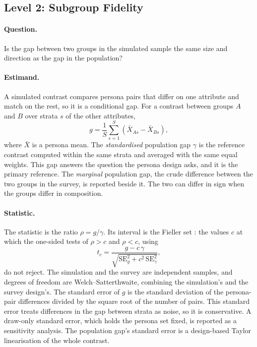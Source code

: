 \subsection*{Level 2: Subgroup Fidelity}
\label{sec:s7-l2}

\paragraph{Question.}
Is the gap between two groups in the simulated sample the same size and direction as the gap in the population?

\paragraph{Estimand.}
A simulated contrast compares persona pairs that differ on one attribute and match on the rest, so it is a conditional gap.
For a contrast between groups $A$ and $B$ over strata $s$ of the other attributes,
\begin{equation}
g = \frac{1}{S} \sum_{s=1}^{S} \left(\bar{X}_{A s} - \bar{X}_{B s}\right),
\end{equation}
where $\bar{X}$ is a persona mean.
The \emph{standardised} population gap $\gamma$ is the reference contrast computed within the same strata and averaged with the same equal weights.
This gap answers the question the persona design asks, and it is the primary reference.
The \emph{marginal} population gap, the crude difference between the two groups in the survey, is reported beside it.
The two can differ in sign when the groups differ in composition.

\paragraph{Statistic.}
The statistic is the ratio $\rho = g / \gamma$.
Its interval is the Fieller set \citep{fieller1954interval}: the values $c$ at which the one-sided tests of $\rho > c$ and $\rho < c$, using
\begin{equation}
t_c = \frac{g - c\,\gamma}{\sqrt{\mathrm{SE}_g^2 + c^2\,\mathrm{SE}_\gamma^2}},
\end{equation}
do not reject.
The simulation and the survey are independent samples, and degrees of freedom are Welch--Satterthwaite, combining the simulation's and the survey design's.
The standard error of $g$ is the standard deviation of the persona-pair differences divided by the square root of the number of pairs.
This standard error treats differences in the gap between strata as noise, so it is conservative.
A draw-only standard error, which holds the persona set fixed, is reported as a sensitivity analysis.
The population gap's standard error is a design-based Taylor linearisation of the whole contrast.

